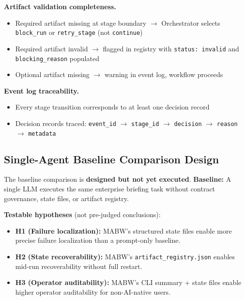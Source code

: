 \documentclass[11pt,a4paper]{article}
\begin{document}
\textbf{Artifact validation completeness.}
\begin{itemize}[leftmargin=*,itemsep=1pt]
    \item Required artifact missing at stage boundary $\rightarrow$ Orchestrator selects \texttt{block\_run} or \texttt{retry\_stage} (not \texttt{continue})
    \item Required artifact invalid $\rightarrow$ flagged in registry with \texttt{status: invalid} and \texttt{blocking\_reason} populated
    \item Optional artifact missing $\rightarrow$ warning in event log, workflow proceeds
\end{itemize}

\textbf{Event log traceability.}
\begin{itemize}[leftmargin=*,itemsep=1pt]
    \item Every stage transition corresponds to at least one decision record
    \item Decision records traced: \texttt{event\_id} $\rightarrow$ \texttt{stage\_id} $\rightarrow$ \texttt{decision} $\rightarrow$ \texttt{reason} $\rightarrow$ \texttt{metadata}
\end{itemize}

\subsection{Single-Agent Baseline Comparison Design}

The baseline comparison is \textbf{designed but not yet executed}. \textbf{Baseline:} A single LLM executes the same enterprise briefing task without contract governance, state files, or artifact registry.

\textbf{Testable hypotheses} (not pre-judged conclusions):

\begin{itemize}[leftmargin=*,itemsep=2pt]
    \item \textbf{H1 (Failure localization):} MABW's structured state files enable more precise failure localization than a prompt-only baseline.
    \item \textbf{H2 (State recoverability):} MABW's \texttt{artifact\_registry.json} enables mid-run recoverability without full restart.
    \item \textbf{H3 (Operator auditability):} MABW's CLI summary + state files enable higher operator auditability for non-AI-native users.
\end{itemize}
\end{document}
